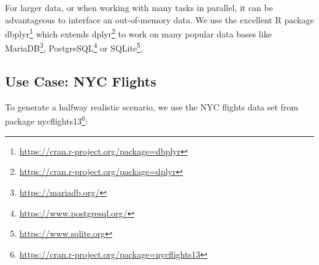 \documentclass[12pt,]{scrbook}
\renewcommand{\href}[2]{#2\footnote{\url{#1}}}
\begin{document}
For larger data, or when working with many tasks in parallel, it can be advantageous to interface an out-of-memory data.
We use the excellent R package \href{https://cran.r-project.org/package=dbplyr}{dbplyr} which extends \href{https://cran.r-project.org/package=dplyr}{dplyr} to work on many popular data bases like \href{https://mariadb.org/}{MariaDB}, \href{https://www.postgresql.org/}{PostgreSQL} or \href{https://www.sqlite.org}{SQLite}.

\hypertarget{use-case-nyc-flights}{%
\subsection{Use Case: NYC Flights}\label{use-case-nyc-flights}}

To generate a halfway realistic scenario, we use the NYC flights data set from package \href{https://cran.r-project.org/package=nycflights13}{nycflights13}:
\end{document}
